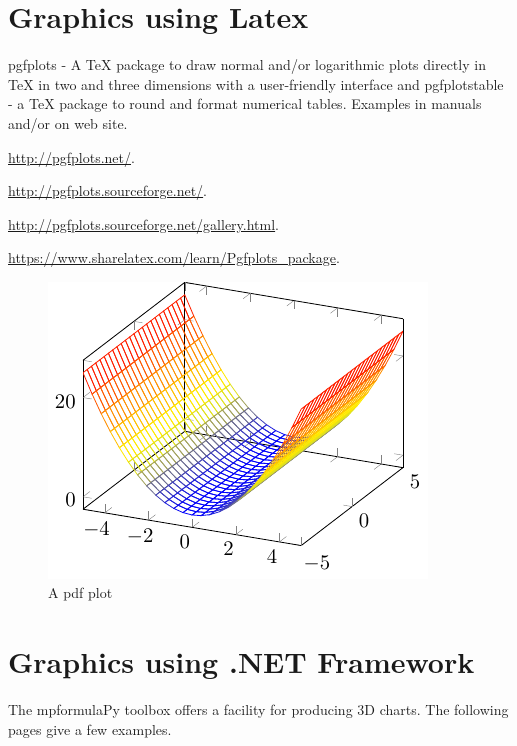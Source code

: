\newpage
\section{Graphics using Latex}
\label{Tutorial: GraphicsLatex}


pgfplots \citep{Feuersanger_2014} - A TeX package to draw normal and/or logarithmic plots directly in TeX in two and three dimensions with a user-friendly interface and pgfplotstable - a TeX package to round and format numerical tables. Examples in manuals and/or on web site.

\vpara
\href{http://pgfplots.net/}{http://pgfplots.net/}. 


\vpara
\href{http://pgfplots.sourceforge.net/}{http://pgfplots.sourceforge.net/}. 

\vpara
\href{http://pgfplots.sourceforge.net/gallery.html}{http://pgfplots.sourceforge.net/gallery.html}. 

\vpara
\href{https://www.sharelatex.com/learn/Pgfplots\_package}{https://www.sharelatex.com/learn/Pgfplots\_package}. 



\begin{figure}[ht]
	\centering
	\includegraphics{figures/3Dplot.pdf}
	\caption{A pdf plot}
	\label{Fig pdf of the Distribution of the Sample Correlation Coefficient}
\end{figure}



\newpage
\section{Graphics using .NET Framework}
\label{Tutorial: Graphics}
The mpformulaPy toolbox offers a facility for producing 3D charts. The following pages give a few examples.

